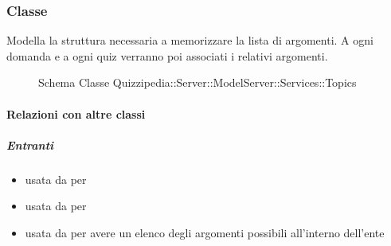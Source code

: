 \subsubsection{Classe }
Modella la struttura necessaria a memorizzare la lista di argomenti. A ogni domanda e a ogni quiz verranno poi associati i relativi argomenti.
\begin{figure}[H]
\centering
\noindent{}
\caption[Schema Classe Topics]{Schema Classe Quizzipedia::Server::ModelServer::Services::Topics}
\end{figure}
\paragraph{Relazioni con altre classi}
\subparagraph{Entranti}
\begin{itemize}
\item usata da  per 
\item usata da  per 
\item usata da  per avere un elenco degli argomenti possibili all'interno dell'ente
\end{itemize}
